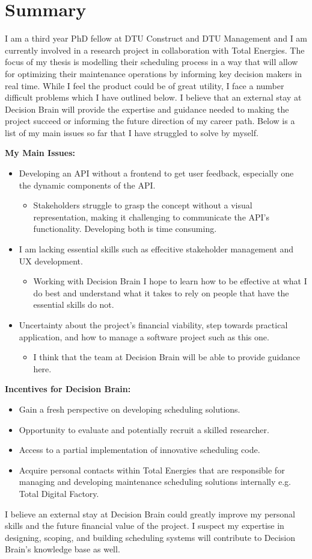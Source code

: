 \section{Summary}
I am a third year PhD fellow at DTU Construct and DTU Management and I am currently involved in a research project in collaboration with Total Energies. The focus of my thesis is modelling 
their scheduling process in a way that will allow for optimizing their maintenance operations by informing key decision makers in real time. While I feel
the product could be of great utility, I face a number difficult problems which I have outlined below. I believe that an external stay at Decision Brain will provide the 
expertise and guidance needed to making the project succeed or informing the future direction of my career path. 
Below is a list of my main issues so far that I have struggled to solve by myself. 

\textbf{My Main Issues:}
\begin{itemize}
	\item Developing an API without a frontend to get user feedback, especially one the dynamic components of the API.
	\begin{itemize}
		\item Stakeholders struggle to grasp the concept without a visual representation, making it challenging to communicate the API's functionality. Developing both is time consuming.
	\end{itemize}
	\item I am lacking essential skills such as effecitive stakeholder management and UX development. 
	\begin{itemize}
		\item Working with Decision Brain I hope to learn how to be effective at what I do best and understand what it takes to 
			  rely on people that have the essential skills do not.
	\end{itemize}
	\item Uncertainty about the project's financial viability, step towards practical application, and how to manage a software project such as this one.
	\begin{itemize}
		\item I think that the team at Decision Brain will be able to provide guidance here.
	\end{itemize}
\end{itemize}

\textbf{Incentives for Decision Brain:} 
\begin{itemize} 
	\item Gain a fresh perspective on developing scheduling solutions. 
	\item Opportunity to evaluate and potentially recruit a skilled researcher. 
	\item Access to a partial implementation of innovative scheduling code.
	\item Acquire personal contacts within Total Energies that are responsible for managing and developing maintenance scheduling solutions internally e.g. Total Digital Factory.
\end{itemize}

I believe an external stay at Decision Brain could greatly improve my personal skills and the future financial value of the project.
I suspect my expertise in designing, scoping, and building scheduling systems will contribute to Decision Brain's knowledge base as well.
